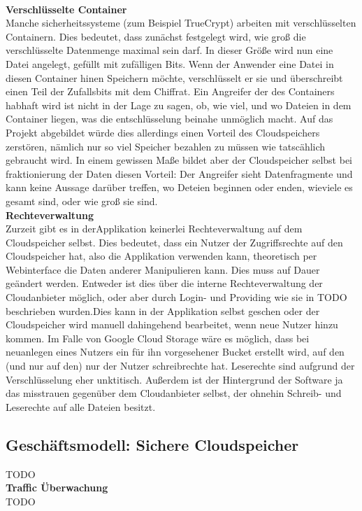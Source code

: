 \documentclass[12pt,a4paper,bibliography=totocnumbered,listof=totocnumbered]{scrartcl}
\begin{document}
\\\textbf{Verschlüsselte Container}\\
Manche sicherheitssysteme (zum Beispiel TrueCrypt) arbeiten mit verschlüsselten Containern. Dies bedeutet, dass zunächst festgelegt wird, wie groß die verschlüsselte Datenmenge maximal sein darf. In dieser Größe wird nun eine Datei angelegt, gefüllt mit zufälligen Bits. Wenn der Anwender eine Datei in diesen Container hinen Speichern möchte, verschlüsselt er sie und überschreibt einen Teil der Zufallsbits mit dem Chiffrat. Ein Angreifer der des Containers habhaft wird ist nicht in der Lage zu sagen, ob, wie viel, und wo Dateien in dem Container liegen, was die entschlüsselung beinahe unmöglich macht. Auf das Projekt abgebildet würde dies allerdings einen Vorteil des Cloudspeichers zerstören, nämlich nur so viel Speicher bezahlen zu müssen wie tatscählich gebraucht wird. In einem gewissen Maße bildet aber der Cloudspeicher selbst bei fraktionierung der Daten diesen Vorteil: Der Angreifer sieht Datenfragmente und kann keine Aussage darüber treffen, wo Deteien beginnen oder enden, wieviele es gesamt sind, oder wie groß sie sind.
\\\textbf{Rechteverwaltung}\\
Zurzeit gibt es in derApplikation keinerlei Rechteverwaltung auf dem Cloudspeicher selbst. Dies bedeutet, dass ein Nutzer der Zugriffsrechte auf den Cloudspeicher hat, also die Applikation verwenden kann, theoretisch per Webinterface die Daten anderer Manipulieren kann. Dies muss auf Dauer geändert werden. Entweder ist dies über die interne Rechteverwaltung der Cloudanbieter möglich, oder aber durch Login- und Providing wie sie in TODO beschrieben wurden.Dies kann in der Applikation selbst geschen oder der Cloudspeicher wird manuell dahingehend bearbeitet, wenn neue Nutzer hinzu kommen. Im Falle von Google Cloud Storage wäre es möglich, dass bei neuanlegen eines Nutzers ein für ihn vorgesehener Bucket erstellt wird, auf den (und nur auf den) nur der Nutzer schreibrechte hat. Leserechte sind aufgrund der Verschlüsselung eher unktitisch. Außerdem ist der Hintergrund der Software ja das misstrauen gegenüber dem Cloudanbieter selbst, der ohnehin Schreib- und Leserechte auf alle Dateien besitzt.

\subsection{Geschäftsmodell: Sichere Cloudspeicher}
TODO
\\\textbf{Traffic Überwachung}\\
TODO
\pagebreak
\end{document}
